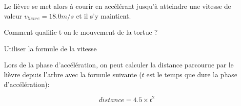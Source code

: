 Le lièvre se met alors à courir en accélérant jusqu'à atteindre une vitesse de valeur $v_{lievre} = \num{18.0} m/s$ et il s'y maintient.
\begin{questions}
	\question[1] Comment qualifie-t-on le mouvement de la tortue ?
	

\vspace*{0.2cm}
	\question[2] Utiliser la formule de la vitesse
	
\vspace*{0.2cm}
	\question[4] Lors de la phase d'accélération, on peut calculer la distance parcourue par le lièvre depuis l'arbre avec la formule suivante ($t$ est le temps que dure la phase d'accélération):
	
	\begin{equation*}
		distance = \num{4.5} \times t^2
	\end{equation*}


\end{questions}
